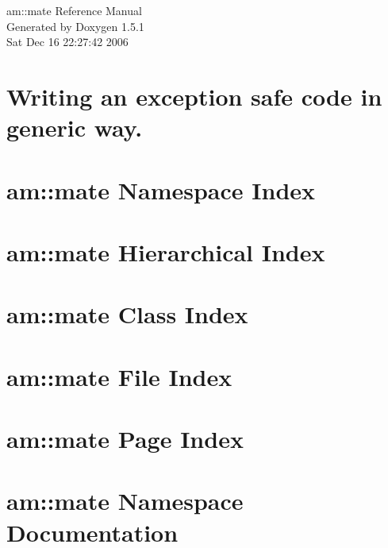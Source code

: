 \documentclass[a4paper]{book}
\begin{document}
\begin{titlepage}
\vspace*{7cm}
\begin{center}
{\Large am::mate Reference Manual}\\
\vspace*{1cm}
{\large Generated by Doxygen 1.5.1}\\
\vspace*{0.5cm}
{\small Sat Dec 16 22:27:42 2006}\\
\end{center}
\end{titlepage}
\clearemptydoublepage
{}
\tableofcontents
\clearemptydoublepage
{}
\chapter{Writing an exception safe code in generic way. }
\label{index}
\chapter{am::mate Namespace Index}

\chapter{am::mate Hierarchical Index}

\chapter{am::mate Class Index}

\chapter{am::mate File Index}

\chapter{am::mate Page Index}

\chapter{am::mate Namespace Documentation}


\end{document}
